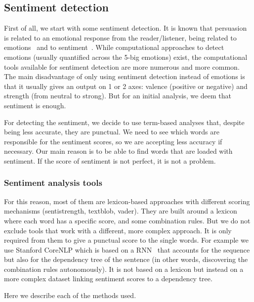 \subsection{Sentiment detection}

First of all, we start with some sentiment detection. It is known that persuasion is related to an emotional response from the reader/listener, being related to emotions~\citep{rocklage2018persuasion,petty2015emotion,desteno2004discrete} and to sentiment~\citep{gatti2014sentiment}.
While computational approaches to detect emotions (usually quantified across the 5-big emotions) exist, the computational tools available for sentiment detection are more numerous and more common. The main disadvantage of only using sentiment detection instead of emotions is that it usually gives an output on 1 or 2 axes: valence (positive or negative) and strength (from neutral to strong). But for an initial analysis, we deem that sentiment is enough.

For detecting the sentiment, we decide to use term-based analyses that, despite being less accurate, they are punctual. We need to see which words are responsible for the sentiment scores, so we are accepting less accuracy if necessary. Our main reason is to be able to find words that are loaded with sentiment. If the score of sentiment is not perfect, it is not a problem.

\subsubsection{\statusgreen Sentiment analysis tools}
For this reason, most of them are lexicon-based approaches with different scoring mechanisms (sentistrength, textblob, vader). They are built around a lexicon where each word has a specific score, and some combination rules. But we do not exclude tools that work with a different, more complex approach. It is only required from them to give a punctual score to the single words. For example we use Stanford CoreNLP which is based on a RNN~\citep{socher2013recursive} that accounts for the sequence but also for the dependency tree of the sentence (in other words, discovering the combination rules autonomously). It is not based on a lexicon but instead on a more complex dataset linking sentiment scores to a dependency tree.

Here we describe each of the methods used.

